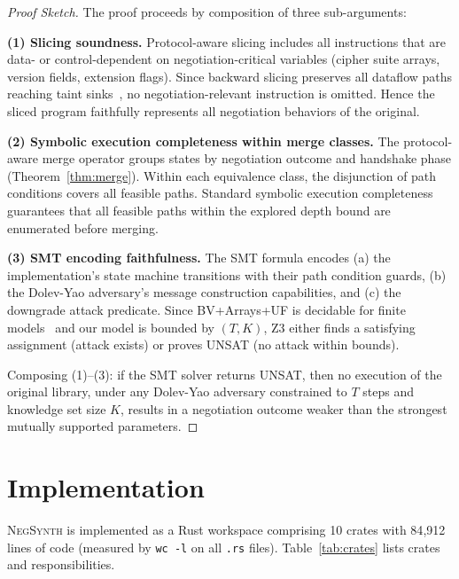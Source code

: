 \documentclass[10pt,twocolumn]{article}
\begin{document}
\begin{proof}[Proof Sketch]
The proof proceeds by composition of three sub-arguments:

\textbf{(1) Slicing soundness.}  Protocol-aware slicing includes all instructions that are data- or control-dependent on negotiation-critical variables (cipher suite arrays, version fields, extension flags).  Since backward slicing preserves all dataflow paths reaching taint sinks~\cite{weiser1984program}, no negotiation-relevant instruction is omitted.  Hence the sliced program faithfully represents all negotiation behaviors of the original.

\textbf{(2) Symbolic execution completeness within merge classes.}  The protocol-aware merge operator groups states by negotiation outcome and handshake phase (Theorem~\ref{thm:merge}).  Within each equivalence class, the disjunction of path conditions covers all feasible paths.  Standard symbolic execution completeness~\cite{cadar2008klee} guarantees that all feasible paths within the explored depth bound are enumerated before merging.

\textbf{(3) SMT encoding faithfulness.}  The SMT formula encodes (a) the implementation's state machine transitions with their path condition guards, (b) the Dolev-Yao adversary's message construction capabilities, and (c) the downgrade attack predicate.  Since BV+Arrays+UF is decidable for finite models~\cite{barrett2009smt} and our model is bounded by $(T, K)$, Z3 either finds a satisfying assignment (attack exists) or proves UNSAT (no attack within bounds).

Composing (1)--(3): if the SMT solver returns UNSAT, then no execution of the original library, under any Dolev-Yao adversary constrained to $T$ steps and knowledge set size $K$, results in a negotiation outcome weaker than the strongest mutually supported parameters.
\end{proof}

\section{Implementation}
\label{sec:implementation}

\textsc{NegSynth} is implemented as a Rust workspace comprising 10 crates with 84{,}912 lines of code (measured by \texttt{wc -l} on all \texttt{.rs} files). Table~\ref{tab:crates} lists crates and responsibilities.
\end{document}
